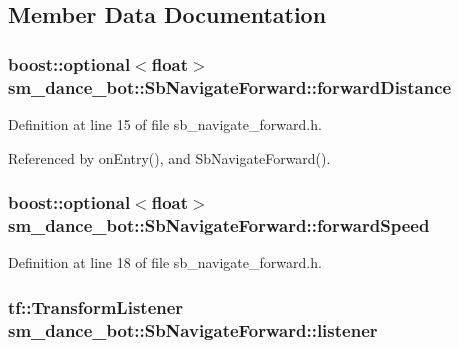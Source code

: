 \subsection{Member Data Documentation}
\subsubsection[{\texorpdfstring{forward\+Distance}{forwardDistance}}]{\setlength{\rightskip}{0pt plus 5cm}boost\+::optional$<$float$>$ sm\+\_\+dance\+\_\+bot\+::\+Sb\+Navigate\+Forward\+::forward\+Distance}\hypertarget{classsm__dance__bot_1_1SbNavigateForward_a2b828c7cd081219448112a2161a62aab}{}\label{classsm__dance__bot_1_1SbNavigateForward_a2b828c7cd081219448112a2161a62aab}


Definition at line 15 of file sb\+\_\+navigate\+\_\+forward.\+h.



Referenced by on\+Entry(), and Sb\+Navigate\+Forward().

\subsubsection[{\texorpdfstring{forward\+Speed}{forwardSpeed}}]{\setlength{\rightskip}{0pt plus 5cm}boost\+::optional$<$float$>$ sm\+\_\+dance\+\_\+bot\+::\+Sb\+Navigate\+Forward\+::forward\+Speed}\hypertarget{classsm__dance__bot_1_1SbNavigateForward_ac0bc4c5bbc1f76d84301f33f16743ef6}{}\label{classsm__dance__bot_1_1SbNavigateForward_ac0bc4c5bbc1f76d84301f33f16743ef6}


Definition at line 18 of file sb\+\_\+navigate\+\_\+forward.\+h.

\subsubsection[{\texorpdfstring{listener}{listener}}]{\setlength{\rightskip}{0pt plus 5cm}tf\+::\+Transform\+Listener sm\+\_\+dance\+\_\+bot\+::\+Sb\+Navigate\+Forward\+::listener}\hypertarget{classsm__dance__bot_1_1SbNavigateForward_ab27255d8f6ae1320acda4fdb092f0df3}{}\label{classsm__dance__bot_1_1SbNavigateForward_ab27255d8f6ae1320acda4fdb092f0df3}


